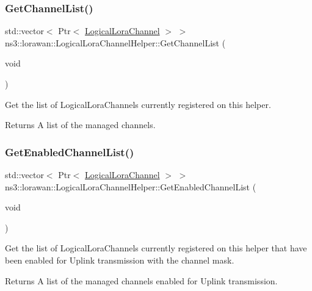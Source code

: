 \subsubsection{\texorpdfstring{Get\+Channel\+List()}{GetChannelList()}}
{\footnotesize\ttfamily std\+::vector$<$ Ptr$<$ \hyperlink{classns3_1_1lorawan_1_1LogicalLoraChannel}{Logical\+Lora\+Channel} $>$ $>$ ns3\+::lorawan\+::\+Logical\+Lora\+Channel\+Helper\+::\+Get\+Channel\+List (\begin{DoxyParamCaption}\item[{void}]{ }\end{DoxyParamCaption})}

Get the list of Logical\+Lora\+Channels currently registered on this helper.

\begin{DoxyReturn}{Returns}
A list of the managed channels. 
\end{DoxyReturn}
\mbox{\label{classns3_1_1lorawan_1_1LogicalLoraChannelHelper_a34579c38bec6daf87b36ee2fd03ee7b0}} 
\subsubsection{\texorpdfstring{Get\+Enabled\+Channel\+List()}{GetEnabledChannelList()}}
{\footnotesize\ttfamily std\+::vector$<$ Ptr$<$ \hyperlink{classns3_1_1lorawan_1_1LogicalLoraChannel}{Logical\+Lora\+Channel} $>$ $>$ ns3\+::lorawan\+::\+Logical\+Lora\+Channel\+Helper\+::\+Get\+Enabled\+Channel\+List (\begin{DoxyParamCaption}\item[{void}]{ }\end{DoxyParamCaption})}

Get the list of Logical\+Lora\+Channels currently registered on this helper that have been enabled for Uplink transmission with the channel mask.

\begin{DoxyReturn}{Returns}
A list of the managed channels enabled for Uplink transmission. 
\end{DoxyReturn}
\mbox{\label{classns3_1_1lorawan_1_1LogicalLoraChannelHelper_af55c016ff95a8002eeb1c8143c79d1b2}} 
